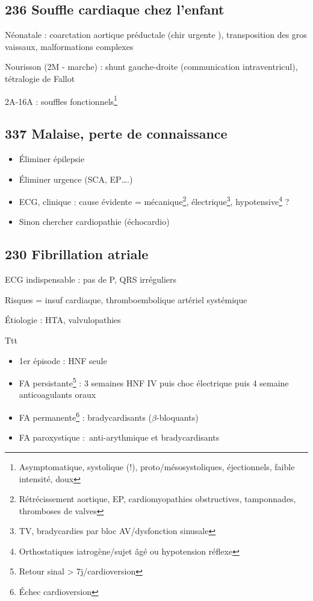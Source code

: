 \documentclass[11pt]{article}
\begin{document}
\subsection{236 Souffle cardiaque chez l'enfant}
\label{sec:org9487a28}
Néonatale : coarctation aortique préductale (chir urgente \faBomb), transposition des gros vaissaux,
malformations complexes

Nourisson (2M - marche) : shunt gauche-droite (communication intraventricul), tétralogie de Fallot

2A-16A : souffles fonctionnels\footnote{Asymptomatique, systolique (!), proto/mésosystoliques, éjectionnels,
faible intensité, doux}
\subsection{337 Malaise, perte de connaissance}
\label{sec:orgc5d6fa4}
\begin{itemize}
\item Éliminer épilepsie
\item Éliminer urgence (SCA, EP\ldots{}.)
\item ECG, clinique : cause évidente = mécanique\footnote{Rétrécissement aortique, EP, cardiomyopathies obstructives, tamponnades, thromboses de valves}, électrique\footnote{TV, bradycardies par bloc AV/dysfonction sinusale}, hypotensive\footnote{Orthostatiques iatrogène/sujet âgé ou hypotension réflexe} ?
\item Sinon chercher cardiopathie  (échocardio)
\end{itemize}
\subsection{230 Fibrillation atriale}
\label{sec:orgeb246dc}
ECG indispensable : pas de P, QRS irréguliers

Risques = insuf cardiaque, thromboembolique artériel systémique

Étiologie : HTA, valvulopathies

Ttt 
\begin{itemize}
\item 1er épisode : HNF seule
\item FA persistante\footnote{Retour sinal > 7j/cardioversion} : 3 semaines HNF IV puis choc électrique puis 4 semaine anticoagulants oraux
\item FA permanente\footnote{Échec cardioversion} : bradycardisants (\(\beta\)-bloquants)
\item FA paroxystique : anti-arythmique et bradycardisants
\end{itemize}
\end{document}
